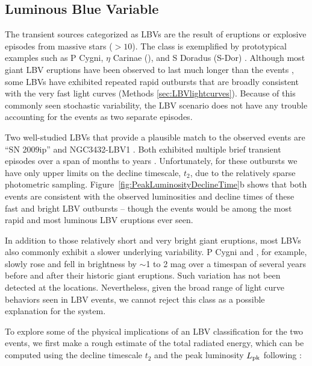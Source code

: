 \subsection{Luminous Blue Variable}

The transient sources categorized as LBVs are the result of eruptions
or explosive episodes from massive stars ($>10$\Msun).  The class is
exemplified by prototypical examples such as P Cygni, $\eta$ Carinae
(\etacar), and S Doradus (S-Dor) \citep[for recent overviews of the
  LBV class, see][]{Smith:2011b, Kochanek:2012}.  Although most giant
LBV eruptions have been observed to last much longer than the \spock
events \citep{Smith:2011b}, some LBVs have exhibited repeated rapid
outbursts that are broadly consistent with the very fast \spock light
curves (Methods \ref{sec:LBVlightcurves}). Because of this commonly
seen stochastic variability, the LBV scenario does not have any
trouble accounting for the \spock events as two separate episodes.

Two well-studied LBVs that provide a plausible match to the observed
\spock events are ``SN 2009ip'' \citep{Maza:2009} and NGC3432-LBV1
\citep{Pastorello:2010}.  Both exhibited multiple brief transient
episodes over a span of months to years \citep[e.g.,][]{Miller:2009,
  Li:2009, Berger:2009, Drake:2010, Pastorello:2010}.  Unfortunately,
for these outbursts we have only upper limits on the decline
timescale, $t_2$, due to the relatively sparse photometric sampling.
Figure~\ref{fig:PeakLuminosityDeclineTime}b shows that both \spock
events are consistent with the observed luminosities and decline times
of these fast and bright LBV outbursts -- though the \spock events
would be among the most rapid and most luminous LBV eruptions ever
seen.

In addition to those relatively short and very bright giant eruptions,
most LBVs also commonly exhibit a slower underlying variability. P
Cygni and \etaCar, for example, slowly rose and fell in brightness by
$\sim$1 to 2 mag over a timespan of several years before and after
their historic giant eruptions.  Such variation has not been detected
at the \spock locations. Nevertheless, given the broad
range of light curve behaviors seen in LBV events, we cannot reject
this class as a possible explanation for the \spock system.

To explore some of the physical implications of an LBV
classification for the two \spock events, we first make a rough
estimate of the total radiated energy, which can be computed using the
decline timescale $t_2$ and the peak luminosity $L_{\rm pk}$ following
\citet{Smith:2011b}:

